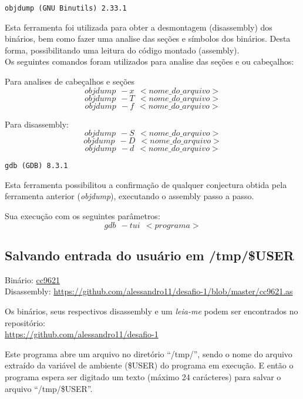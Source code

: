 \begin{verbatim}
objdump (GNU Binutils) 2.33.1
\end{verbatim}

Esta ferramenta foi utilizada para obter a desmontagem (disassembly)
dos binários, bem como fazer uma analise das seções e símbolos dos
binários. Desta forma, possibilitando uma leitura do código montado
(assembly).\\

Os seguintes comandos foram utilizados para analise das seções e ou
cabeçalhos:

Para analises de cabeçalhos e seções\\
$$objdump \ \ -x \ \ <nome\_do\_arquivo>$$
$$objdump \ \ -T \ \ <nome\_do\_arquivo>$$
$$objdump \ \ -f \ \ <nome\_do\_arquivo>$$

Para disassembly:\\
$$objdump \ \ -S \ \ <nome\_do\_arquivo>$$
$$objdump \ \ -D \ \ <nome\_do\_arquivo>$$
$$objdump \ \ -d \ \ <nome\_do\_arquivo>$$

\begin{verbatim}
gdb (GDB) 8.3.1
\end{verbatim}

Esta ferramenta possibilitou a confirmação de qualquer conjectura obtida pela
ferramenta anterior (\emph{objdump}), executando o assembly passo a passo.

Sua execução com os seguintes parâmetros:
$$gdb \ \ -tui \ \ <programa>$$

\subsection{Salvando entrada do usuário em /tmp/\$USER}
\noindent Binário: \href{https://s3.amazonaws.com/chaordic-desafio-cloud/cc9621}{cc9621}\\
Disassembly: \href{https://github.com/alessandro11/desafio-1/blob/master/cc9621.as}{https://github.com/alessandro11/desafio-1/blob/master/cc9621.as}\\
\par
Os binários, seus respectivos disassembly e um \textit{leia-me} podem
ser encontrados no repositório:\\
\href{https://github.com/alessandro11/desafio-1}{https://github.com/alessandro11/desafio-1}\\

\par Este programa abre um arquivo no diretório ``/tmp/'', sendo o nome do
arquivo extraído da variável de ambiente (\$USER) do programa em execução. E
então o programa espera ser digitado um texto (máximo 24 carácteres)
para salvar o arquivo ``/tmp/\$USER''.

